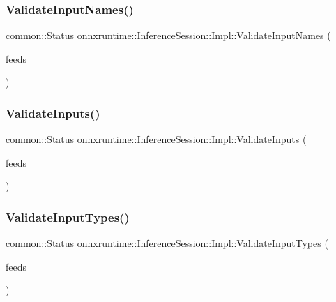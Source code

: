 \subsubsection{\texorpdfstring{Validate\+Input\+Names()}{ValidateInputNames()}}
{\footnotesize\ttfamily \mbox{\hyperlink{classonnxruntime_1_1common_1_1Status}{common\+::\+Status}} onnxruntime\+::\+Inference\+Session\+::\+Impl\+::\+Validate\+Input\+Names (\begin{DoxyParamCaption}\item[{const \mbox{\hyperlink{namespaceonnxruntime_a48b01f0410ec8d693dbd40d1132bd66c}{Name\+M\+L\+Val\+Map}} \&}]{feeds }\end{DoxyParamCaption})\hspace{0.3cm}{\ttfamily [inline]}}

\mbox{\label{classonnxruntime_1_1InferenceSession_1_1Impl_a5fda5b21f7ca7cb53ea657d886c2e176}} 
\subsubsection{\texorpdfstring{Validate\+Inputs()}{ValidateInputs()}}
{\footnotesize\ttfamily \mbox{\hyperlink{classonnxruntime_1_1common_1_1Status}{common\+::\+Status}} onnxruntime\+::\+Inference\+Session\+::\+Impl\+::\+Validate\+Inputs (\begin{DoxyParamCaption}\item[{const \mbox{\hyperlink{namespaceonnxruntime_a48b01f0410ec8d693dbd40d1132bd66c}{Name\+M\+L\+Val\+Map}} \&}]{feeds }\end{DoxyParamCaption})\hspace{0.3cm}{\ttfamily [inline]}}

\mbox{\label{classonnxruntime_1_1InferenceSession_1_1Impl_a10de0bc3bca4ef1e0698c44719358441}} 
\subsubsection{\texorpdfstring{Validate\+Input\+Types()}{ValidateInputTypes()}}
{\footnotesize\ttfamily \mbox{\hyperlink{classonnxruntime_1_1common_1_1Status}{common\+::\+Status}} onnxruntime\+::\+Inference\+Session\+::\+Impl\+::\+Validate\+Input\+Types (\begin{DoxyParamCaption}\item[{const \mbox{\hyperlink{namespaceonnxruntime_a48b01f0410ec8d693dbd40d1132bd66c}{Name\+M\+L\+Val\+Map}} \&}]{feeds }\end{DoxyParamCaption})\hspace{0.3cm}{\ttfamily [inline]}}

